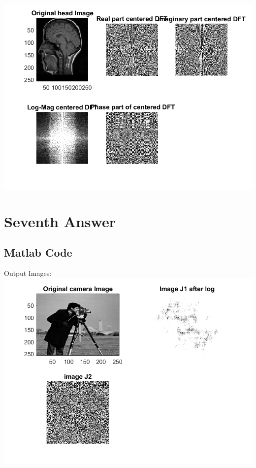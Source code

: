 \documentclass[11pt]{article} %
\begin{document}
\includegraphics{Head.png}

\section {Seventh Answer}
\subsection*{Matlab Code}

Output Images:
\includegraphics{Q7.png}
\end{document}
